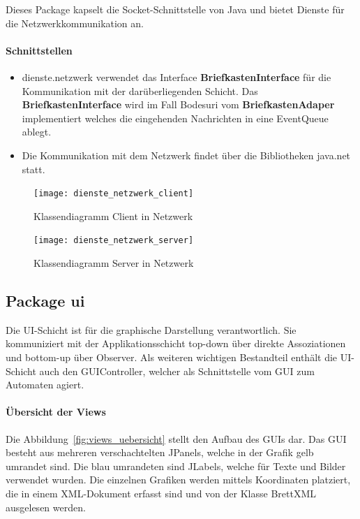 \documentclass[12pt,halfparskip]{scrartcl}
\begin{document}
Dieses Package kapselt die Socket-Schnittstelle von Java und bietet Dienste für die Netzwerkkommunikation an.

\paragraph{Schnittstellen}
\begin{itemize}
	\item dienste.netzwerk verwendet das Interface \textbf{BriefkastenInterface} für die Kommunikation mit der darüberliegenden Schicht. Das \textbf{BriefkastenInterface} wird im Fall Bodesuri vom \textbf{BriefkastenAdaper} implementiert welches die eingehenden Nachrichten in eine EventQueue ablegt.
	\item Die Kommunikation mit dem Netzwerk findet über die Bibliotheken java.net statt.
\end{itemize}

\begin{figure}[H]
	\centering
	\texttt{[image: dienste\_netzwerk\_client]}
	\caption{Klassendiagramm Client in Netzwerk}
	\label{fig:dienste_netzwerk_client}
\end{figure}

\begin{figure}[H]
	\centering
	\texttt{[image: dienste\_netzwerk\_server]}
	\caption{Klassendiagramm Server in Netzwerk}
	\label{fig:dienste_netzwerk_server}
\end{figure}

\clearpage
\subsection{Package ui}

Die UI-Schicht ist für die graphische Darstellung verantwortlich. Sie kommuniziert mit der Applikationsschicht top-down über direkte Assoziationen und bottom-up über Observer. Als weiteren wichtigen Bestandteil enthält die UI-Schicht auch den GUIController, welcher als Schnittstelle vom GUI zum Automaten agiert.

\paragraph{Übersicht der Views}
Die Abbildung~\vref{fig:views_uebersicht} stellt den Aufbau des GUIs dar. Das GUI besteht aus mehreren verschachtelten JPanels, welche in der Grafik gelb umrandet sind. Die blau umrandeten sind JLabels, welche für Texte und  Bilder verwendet wurden. Die einzelnen Grafiken werden mittels Koordinaten platziert, die in einem XML-Dokument erfasst sind und von der Klasse BrettXML ausgelesen werden.
\end{document}
